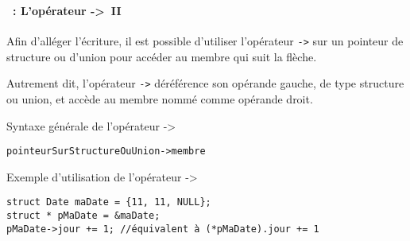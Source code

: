 \begin{frame}[containsverbatim]
  \frametitle{\secname}
  \framesubtitle{\subsecname~: L'opérateur ->~II}

  Afin d'alléger l'écriture, il est possible d'utiliser l'opérateur \texttt{->} sur un pointeur de structure ou d'union pour accéder au membre qui suit la flèche.
  \vspace{0.3cm}
  \par
  Autrement dit, l'opérateur \texttt{->} déréférence son opérande gauche, de type structure ou union, et accède au membre nommé comme opérande droit. 
  \begin{block}{Syntaxe générale de l'opérateur ->}
    \begin{verbatim}
pointeurSurStructureOuUnion->membre\end{verbatim}
  \end{block}
  \begin{exampleblock}{Exemple d'utilisation de l'opérateur ->}
    \begin{verbatim}
struct Date maDate = {11, 11, NULL};
struct * pMaDate = &maDate;
pMaDate->jour += 1; //équivalent à (*pMaDate).jour += 1\end{verbatim}
  \end{exampleblock}
\end{frame}


